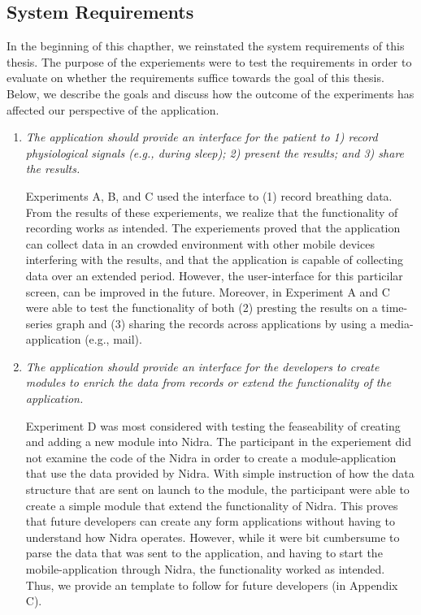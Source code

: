 \subsection{System Requirements}
In the beginning of this chapther, we reinstated the system requirements of this thesis. The purpose of the experiements were to test the requirements in order to evaluate on whether the requirements suffice towards the goal of this thesis. Below, we describe the goals and discuss how the outcome of the experiments has affected our perspective of the application.

\begin{enumerate}
    \item \textit{The application should provide an interface for the patient to 1) record physiological signals (e.g., during sleep); 2) present the results; and 3) share the results.}
    
    Experiments A, B, and C used the interface to (1) record breathing data. From the results of these experiements, we realize that the functionality of recording works as intended. The experiements proved that the application can collect data in an crowded environment with other mobile devices interfering with the results, and that the application is capable of collecting data over an extended period. However, the user-interface for this particilar screen, can be improved in the future. Moreover, in Experiment A and C were able to test the functionality of both (2) presting the results on a time-series graph and (3) sharing the records across applications by using a media-application (e.g., mail). 

    \item \textit{The application should provide an interface for the developers to create modules to enrich the data from records or extend the functionality of the application.}
    
    Experiment D was most considered with testing the feaseability of creating and adding a new module into Nidra. The participant in the experiement did not examine the code of the Nidra in order to create a module-application that use the data provided by Nidra. With simple instruction of how the data structure that are sent on launch to the module, the participant were able to create a simple module that extend the functionality of Nidra. This proves that future developers can create any form applications without having to understand how Nidra operates. However, while it were bit cumbersume to parse the data that was sent to the application, and having to start the mobile-application through Nidra, the functionality worked as intended. Thus, we provide an template to follow for future developers (in Appendix C). 
    

\end{enumerate}
